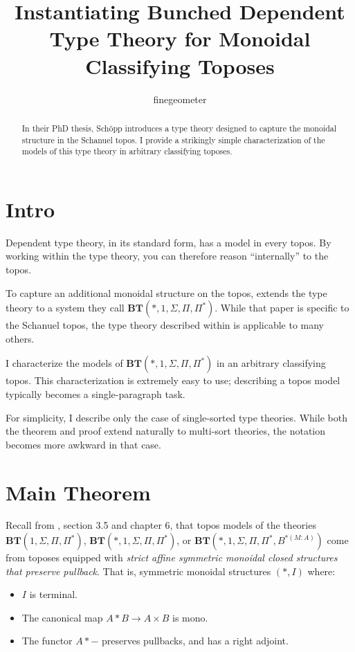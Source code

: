 \documentclass{article}
\title{Instantiating Bunched Dependent Type Theory for Monoidal Classifying Toposes}
\author{finegeometer}
\begin{document}
\maketitle

\begin{abstract}
    In their PhD thesis, Sch\"opp introduces a type theory designed to capture the monoidal structure in the Schanuel topos.
    I provide a strikingly simple characterization of the models of this type theory in arbitrary classifying toposes.
\end{abstract}

\listoftodos

\section{Intro}

Dependent type theory, in its standard form, has a model in every topos.
By working within the type theory, you can therefore reason ``internally'' to the topos.

To capture an additional monoidal structure on the topos,
\cite{schopp} extends the type theory to a system they call \(\mathbf{BT}(*, 1, \Sigma, \Pi, \Pi^*)\).
While that paper is specific to the Schanuel topos, the type theory described within is applicable to many others.

I characterize the models of \(\mathbf{BT}(*, 1, \Sigma, \Pi, \Pi^*)\) in an arbitrary classifying topos.
This characterization is extremely easy to use; describing a topos model typically becomes a single-paragraph task.

For simplicity, I describe only the case of single-sorted type theories.
While both the theorem and proof extend naturally to multi-sort theories,
the notation becomes more awkward in that case.

\section{Main Theorem}

Recall from \cite{schopp}, section 3.5 and chapter 6, that topos models of the theories
\(\mathbf{BT}(1, \Sigma, \Pi, \Pi^*)\), \(\mathbf{BT}(*, 1, \Sigma, \Pi, \Pi^*)\), or \(\mathbf{BT}(*, 1, \Sigma, \Pi, \Pi^*, B^{*(M:A)})\)
come from toposes equipped with \emph{strict affine symmetric monoidal closed structures that preserve pullback}.
That is, symmetric monoidal structures \((*,I)\) where:
\begin{itemize}
    \item \(I\) is terminal.
    \item The canonical map \(A * B \to A \times B\) is mono.
    \item The functor \(A * -\) preserves pullbacks, and has a right adjoint.
\end{itemize}
\end{document}
